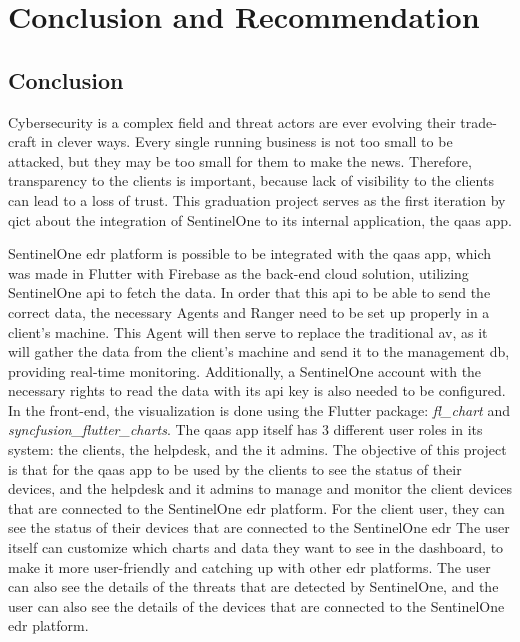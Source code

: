 \chapter{Conclusion and Recommendation}

\begin{multicols}{2}

  \section{Conclusion}
  Cybersecurity is a complex field and threat actors are ever evolving their trade-craft in clever ways. Every single
  running business is not too small to be attacked, but they may be too small for them to make the news. Therefore, transparency
  to the clients is important, because lack of visibility to the clients can lead to a loss of trust. This graduation project serves as the
  first iteration by \acrshort{qict} about the integration of SentinelOne to its internal application, the \acrshort{qaas} app.

  SentinelOne \acrshort{edr} platform is possible to be integrated with the \acrshort{qaas} app, which was made in Flutter with
  Firebase as the back-end cloud solution, utilizing SentinelOne \acrshort{api} to fetch the data. In order that this \acrshort{api}
  to be able to send the correct data, the necessary Agents and Ranger need to be set up properly in a client's machine. This Agent will then serve
  to replace the traditional \acrshort{av}, as it will gather the data from the client's machine and send it to the management \acrshort{db}, providing real-time
  monitoring. Additionally, a SentinelOne account with the necessary rights to read the data with its \acrshort{api} key is also needed to be configured. In the
  front-end, the visualization is done using the Flutter package: \textit{fl\_chart} and \textit{syncfusion\_flutter\_charts}. The \acrshort{qaas} app itself has 3
  different user roles in its system: the clients, the helpdesk, and the \acrshort{it} admins. The objective of this project is that for the \acrshort{qaas} app to
  be used by the clients to see the status of their devices, and the helpdesk and \acrshort{it} admins to manage and monitor the client devices that are connected to
  the SentinelOne \acrshort{edr} platform. For the client user, they can see the status of their devices that are connected to the SentinelOne \acrshort{edr}
  The user itself can customize which charts and data they want to see in the dashboard,
  to make it more user-friendly and catching up with other \acrshort{edr} platforms. The user can also see the details of the
  threats that are detected by SentinelOne, and the user can also see the details of the devices that are connected to the SentinelOne
  \acrshort{edr} platform.


\end{multicols}
